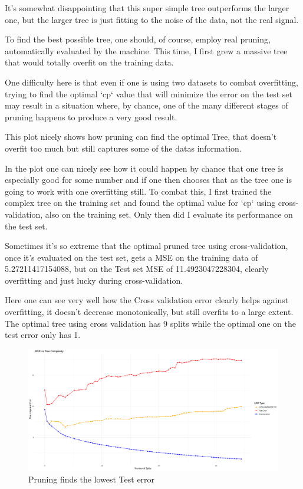 \documentclass[12pt]{article}
\begin{document}
It's somewhat disappointing that this super simple tree outperforms the larger one, but the larger tree is just fitting to the noise of the data, not the real signal.

To find the best possible tree, one should, of course, employ real pruning, automatically evaluated by the machine. This time, I first grew a massive tree that would totally overfit on the training data.

One difficulty here is that even if one is using two datasets to combat overfitting, trying to find the optimal `cp` value that will minimize the error on the test set may result in a situation where, by chance, one of the many different stages of pruning happens to produce a very good result.



This plot nicely shows how pruning can find the optimal Tree, that doesn't overfit too much but still captures some of the datas information.

In the  plot one can nicely see how it could happen by chance that one tree is especially good for some number and if one then chooses that as the tree one is going to work with one overfitting still.
To combat this, I first trained the complex tree on the training set and found the optimal value for `cp` using cross-validation, also on the training set. Only then did I evaluate its performance on the test set.

Sometimes it's so extreme that the optimal pruned tree using cross-validation, once it's evaluated on the test set, gets a MSE on the training data of 5.27211417154088, but on the Test set MSE of 11.4923047228304, clearly overfitting and just lucky during cross-validation.

Here one can see very well how the Cross validation error clearly helps against overfitting, it doesn't decrease monotonically, but still overfits to a large extent. The optimal tree using cross validation has 9 splits while the optimal one on the test error only has 1.


\begin{figure}
    \centering
    \includegraphics[scale=0.30]{triple_pruning_plot.pdf}
    \caption{Pruning finds the lowest Test error}
\end{figure}
\end{document}
